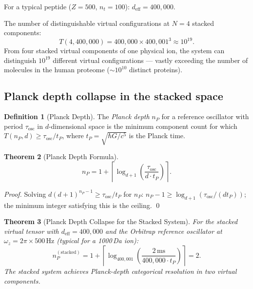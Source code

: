 \documentclass[twocolumn,10pt,a4paper]{article}
\theoremstyle{thmstyle}
\newtheorem{theorem}{Theorem}[section]
\theoremstyle{definition}
\newtheorem{definition}[theorem]{Definition}
\theoremstyle{remark}
\begin{document}
For a typical peptide ($Z = 500$, $n_t = 100$):
$d_{\text{eff}} = 400{,}000$.

The number of distinguishable virtual configurations at $N = 4$ stacked
components:
\begin{equation}
T(4, 400{,}000) = 400{,}000 \times 400{,}001^3 \approx 10^{19}.
\label{eq:T4}
\end{equation}
From four stacked virtual components of one physical ion, the system can
distinguish $10^{19}$ different virtual configurations --- vastly
exceeding the number of molecules in the human proteome ($\sim 10^{10}$
distinct proteins).

\subsection{Planck depth collapse in the stacked space}

\begin{definition}[Planck Depth]
\label{def:planck}
The \emph{Planck depth} $n_P$ for a reference oscillator with period
$\tau_{\text{osc}}$ in $d$-dimensional space is the minimum component
count for which $T(n_P, d) \geq \tau_{\text{osc}}/t_P$, where
$t_P = \sqrt{\hbar G/c^5}$ is the Planck time.
\end{definition}

\begin{theorem}[Planck Depth Formula]
\label{thm:planck}
\begin{equation}
n_P = 1 + \left\lceil\log_{d+1}\!\left(\frac{\tau_{\text{osc}}}{d \cdot t_P}\right)\right\rceil.
\label{eq:planck}
\end{equation}
\end{theorem}

\begin{proof}
Solving $d(d+1)^{n_P - 1} \geq \tau_{\text{osc}}/t_P$ for $n_P$:
$n_P - 1 \geq \log_{d+1}(\tau_{\text{osc}}/(dt_P))$; the minimum
integer satisfying this is the ceiling. \qed
\end{proof}

\begin{theorem}[Planck Depth Collapse for the Stacked System]
\label{thm:planck-collapse}
For the stacked virtual tensor with $d_{\text{eff}} = 400{,}000$ and
the Orbitrap reference oscillator at $\omega_z = 2\pi \times 500\,\mathrm{Hz}$
(typical for a 1000\,Da ion):
\begin{equation}
n_P^{(\text{stacked})} = 1 + \left\lceil\log_{400{,}001}\!\left(\frac{2\,\mathrm{ms}}{400{,}000 \cdot t_P}\right)\right\rceil = 2.
\label{eq:planck-stacked}
\end{equation}
The stacked system achieves Planck-depth categorical resolution in two
virtual components.
\end{theorem}
\end{document}
